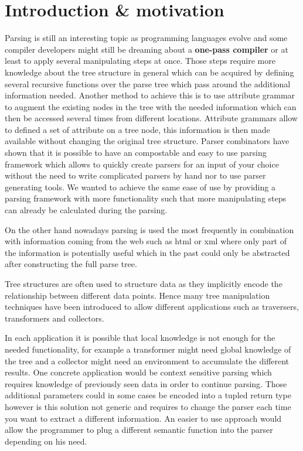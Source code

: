 \section{Introduction \& motivation}
Parsing is still an interesting topic as programming languages evolve and some compiler developers might still be dreaming about a \textbf{one-pass compiler} or at least to apply several manipulating steps at once. Those steps require more knowledge about the tree structure in general which can be acquired by defining several recursive functions over the parse tree which pass around the additional information needed. Another method to achieve this is to use attribute grammar to augment the existing nodes in the tree with the needed information which can then be accessed several times from different locations. Attribute grammars allow to defined a set of attribute on a tree node, this information is then made available without changing the original tree structure.
Parser combinators have shown that it is possible to have an compostable and easy to use parsing framework which allows to quickly create parsers for an input of your choice without the need to write complicated parsers by hand nor to use parser generating tools. We wanted to achieve the same ease of use by providing a parsing framework with more functionality such that more manipulating steps can already be calculated during the parsing.

On the other hand nowadays parsing is used the most frequently in combination with information coming from the web such as html or xml where only part of the information is potentially useful which in the past could only be abstracted after constructing the full parse tree.

Tree structures are often used to structure data as they implicitly encode the relationship between different data points. Hence many tree manipulation techniques have been introduced to allow different applications such as traversers, transformers and collectors.

In each application it is possible that local knowledge is not enough for the needed functionality, for example a transformer might need global knowledge of the tree and a collector might need an environment to accumulate the different results. One concrete application would be context sensitive parsing which requires knowledge of previously seen data in order to continue parsing. Those additional parameters could in some cases be encoded into a tupled return type however is this solution not generic and requires to change the parser each time you want to extract a different information. An easier to use approach would allow the programmer to plug a different semantic function into the parser depending on his need.

